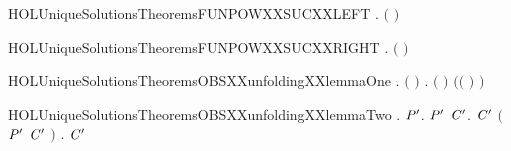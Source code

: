 \newcommand{\HOLUniqueSolutionsDate}{21 June 2020}
\newcommand{\HOLUniqueSolutionsTime}{18:11}
\begin{SaveVerbatim}{HOLUniqueSolutionsTheoremsFUNPOWXXSUCXXLEFT}
\HOLTokenTurnstile{} \HOLSymConst{\HOLTokenForall{}} .   \ensuremath{(} \ensuremath{)} \HOLSymConst{\ensuremath{=}}    \HOLConst{\HOLTokenCompose} 
\end{SaveVerbatim}
\newcommand{\HOLUniqueSolutionsTheoremsFUNPOWXXSUCXXLEFT}{\UseVerbatim{HOLUniqueSolutionsTheoremsFUNPOWXXSUCXXLEFT}}
\begin{SaveVerbatim}{HOLUniqueSolutionsTheoremsFUNPOWXXSUCXXRIGHT}
\HOLTokenTurnstile{} \HOLSymConst{\HOLTokenForall{}} .   \ensuremath{(} \ensuremath{)} \HOLSymConst{\ensuremath{=}}  \HOLConst{\HOLTokenCompose}   
\end{SaveVerbatim}
\newcommand{\HOLUniqueSolutionsTheoremsFUNPOWXXSUCXXRIGHT}{\UseVerbatim{HOLUniqueSolutionsTheoremsFUNPOWXXSUCXXRIGHT}}
\begin{SaveVerbatim}{HOLUniqueSolutionsTheoremsOBSXXunfoldingXXlemmaOne}
\HOLTokenTurnstile{} \HOLSymConst{\HOLTokenForall{}}  .
         \HOLSymConst{\HOLTokenConj{}}   \HOLSymConst{\HOLTokenConj{}}   \ensuremath{(} \ensuremath{)} \HOLSymConst{\HOLTokenImp{}}
       \HOLSymConst{\HOLTokenForall{}}.  \ensuremath{(} \ensuremath{)} \ensuremath{(}\ensuremath{(} \HOLConst{\HOLTokenCompose}   \ensuremath{)} \ensuremath{)}
\end{SaveVerbatim}
\newcommand{\HOLUniqueSolutionsTheoremsOBSXXunfoldingXXlemmaOne}{\UseVerbatim{HOLUniqueSolutionsTheoremsOBSXXunfoldingXXlemmaOne}}
\begin{SaveVerbatim}{HOLUniqueSolutionsTheoremsOBSXXunfoldingXXlemmaTwo}
\HOLTokenTurnstile{} \HOLSymConst{\HOLTokenForall{}}.
         \HOLSymConst{\HOLTokenImp{}}
       \HOLSymConst{\HOLTokenForall{}}  \ensuremath{\HOLBoundVar{P}\sp{\prime}}.
             \HOLTokenTransBegin{}\HOLTokenTransEnd \ensuremath{\HOLBoundVar{P}\sp{\prime}} \HOLSymConst{\HOLTokenImp{}}
           \HOLSymConst{\HOLTokenExists{}}\ensuremath{\HOLBoundVar{C}\sp{\prime}}.  \ensuremath{\HOLBoundVar{C}\sp{\prime}} \HOLSymConst{\HOLTokenConj{}} \ensuremath{(}\ensuremath{\HOLBoundVar{P}\sp{\prime}} \HOLSymConst{\ensuremath{=}} \ensuremath{\HOLBoundVar{C}\sp{\prime}} \ensuremath{)} \HOLSymConst{\HOLTokenConj{}} \HOLSymConst{\HOLTokenForall{}}.   \HOLTokenTransBegin{}\HOLTokenTransEnd \ensuremath{\HOLBoundVar{C}\sp{\prime}} 
\end{SaveVerbatim}

